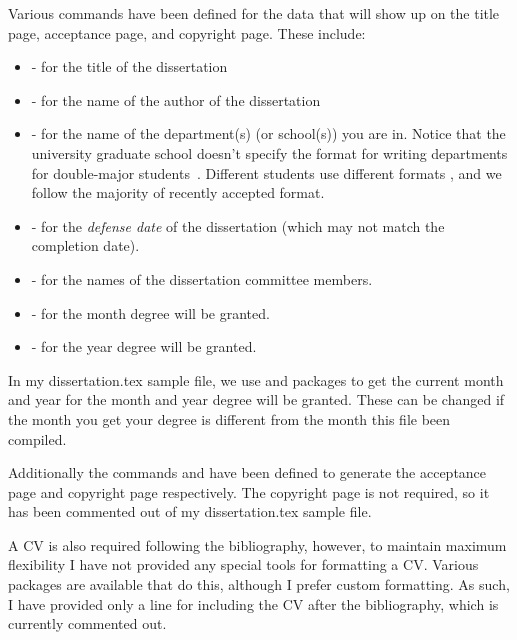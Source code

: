 Various commands have been defined for the data that will show up on the title page, acceptance page, and copyright page.  These include:
\begin{itemize}
 \item {} - for the title of the dissertation
 \item {} - for the name of the author of the dissertation
 \item {} - for the name of the department(s) (or school(s)) you are in.  Notice that the university graduate school doesn't specify the format for writing departments for double-major students~\cite{DoctoralFormatting2018}.  Different students use different formats \cite{Hansen2015,Agmon2016,Bambach2016}, and we follow the majority of recently accepted format.
 \item {} - for the \emph{defense date} of the dissertation (which may not match the completion date).
 \item {} - for the names of the dissertation committee members.
 \item {} - for the month degree will be granted. 
 \item {} - for the year degree will be granted.
\end{itemize}

In my dissertation.tex sample file, we use  and  packages to get the current month and year for the month and year degree will be granted. These can be changed if the month you get your degree is different from the month this file been compiled.

Additionally the commands  and  have been defined to generate the acceptance page and copyright page
respectively.  The copyright page is not required, so it has been commented out of my dissertation.tex sample file.

A CV is also required following the bibliography, however, to maintain maximum flexibility I have not provided any special tools for
formatting a CV.  Various packages are available that do this, although I prefer custom formatting. As such, I have provided only a
line for including the CV after the bibliography, which is currently commented out.



